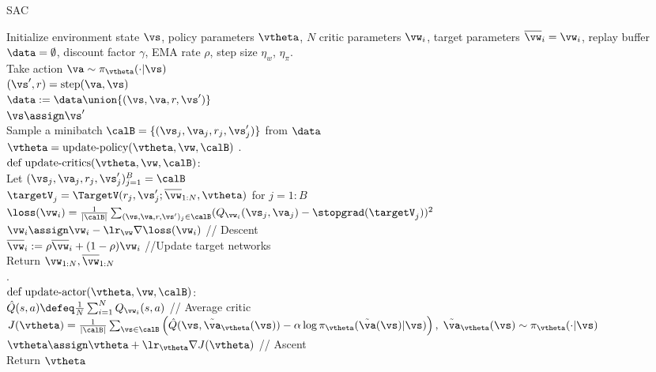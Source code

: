 \begin{algorithm}
\dontprintsemicolon
\caption{SAC}
\label{algo:SAC}
Initialize environment state $\vs$,
policy parameters $\vtheta$,
$N$ critic parameters $\vw_i$,
target parameters $\overline{\vw}_i = \vw_i$,
replay buffer $\data=\emptyset$,
discount factor $\gamma$,
EMA rate $\rho$,
step size $\eta_w$, $\eta_\pi$.
\\
       {
         Take action $\va \sim \pi_{\vtheta}(\cdot|\vs)$ \\
         $(\vs',r) = \text{step}(\va, \vs)$ \\
         $\data := \data \union
         \{ (\vs, \va, r, \vs') \}$ \\
         $\vs \assign \vs'$ \\
         Sample a minibatch $\calB = \{(\vs_j,\va_j,r_j,\vs'_j)\}$
         from $\data$\\
         $\vtheta = \text{update-policy}(\vtheta,\vw, \calB)$
        }
.\\
$\text{def update-critics}(\vtheta,\vw,\calB)$: \\
       Let $(\vs_j,\va_j,r_j,\vs'_j)_{j=1}^B = \calB$ \\
       $\targetV_j = \TargetV(r_j,\vs'_j; \overline{\vw}_{1:N}, \vtheta)$ for  $j=1:B$ \\
    {
      $\loss(\vw_i) = \frac{1}{|\calB|} \sum_{(\vs,\va,r,\vs')_j \in
        \calB} (Q_{\vw_i}(\vs_j,\va_j) - \stopgrad(\targetV_j))^2$\\
      $\vw_i \assign \vw_i - \lr_{\vw} \nabla \loss(\vw_i)$ // Descent
      \\
      $\overline{\vw}_i := \rho \overline{\vw}_i
      + (1-\rho) \vw_i$       //Update target networks \\
    }
    Return $\vw_{1:N}, \overline{\vw}_{1:N}$\\
.\\
$\text{def update-actor}(\vtheta,\vw,\calB)$: \\
    $\hat{Q}(s,a)  \defeq \frac{1}{N} \sum_{i=1}^N
    Q_{\vw_i}(s,a)$ // Average critic\\
$J(\vtheta) =
\frac{1}{|\calB|} \sum_{\vs \in \calB}
\left(
\hat{Q}(\vs, \tilde{\va}_{\vtheta}(\vs))
-
\alpha \log \pi_{\vtheta}(\tilde{\va}(\vs)|\vs)
\right),
\;  \tilde{\va}_{\vtheta}(\vs) \sim \pi_{\vtheta}(\cdot|\vs)
$ \\
$\vtheta \assign \vtheta +  \lr_{\vtheta} \nabla J(\vtheta)$ // Ascent\\
Return $\vtheta$
\end{algorithm}


